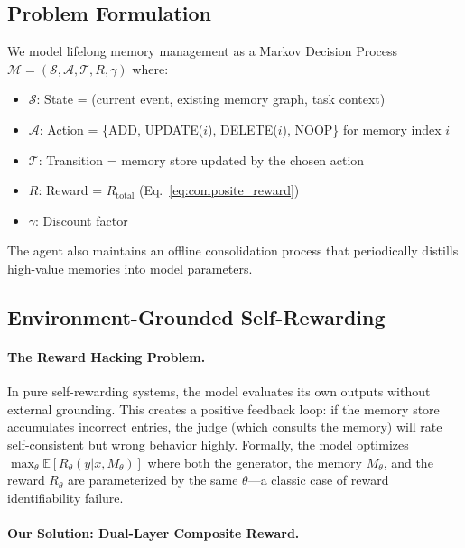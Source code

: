 \documentclass{article}
\newcommand{\rtotal}{R_{\mathrm{total}}}
\begin{document}
\subsection{Problem Formulation}
\label{sec:formulation}

We model lifelong memory management as a Markov Decision Process $\mathcal{M} = (\mathcal{S}, \mathcal{A}, \mathcal{T}, R, \gamma)$ where:
\begin{itemize}[nosep, leftmargin=*]
    \item $\mathcal{S}$: State = (current event, existing memory graph, task context)
    \item $\mathcal{A}$: Action = \{ADD, UPDATE($i$), DELETE($i$), NOOP\} for memory index $i$
    \item $\mathcal{T}$: Transition = memory store updated by the chosen action
    \item $R$: Reward = $\rtotal$ (Eq.~\ref{eq:composite_reward})
    \item $\gamma$: Discount factor
\end{itemize}

The agent also maintains an offline consolidation process that periodically distills high-value memories into model parameters.

\subsection{Environment-Grounded Self-Rewarding}
\label{sec:reward}

\paragraph{The Reward Hacking Problem.}
In pure self-rewarding systems, the model evaluates its own outputs without external grounding. This creates a positive feedback loop: if the memory store accumulates incorrect entries, the judge (which consults the memory) will rate self-consistent but wrong behavior highly. Formally, the model optimizes $\max_\theta \mathbb{E}[R_\theta(y | x, M_\theta)]$ where both the generator, the memory $M_\theta$, and the reward $R_\theta$ are parameterized by the same $\theta$---a classic case of reward identifiability failure.

\paragraph{Our Solution: Dual-Layer Composite Reward.}
\end{document}
